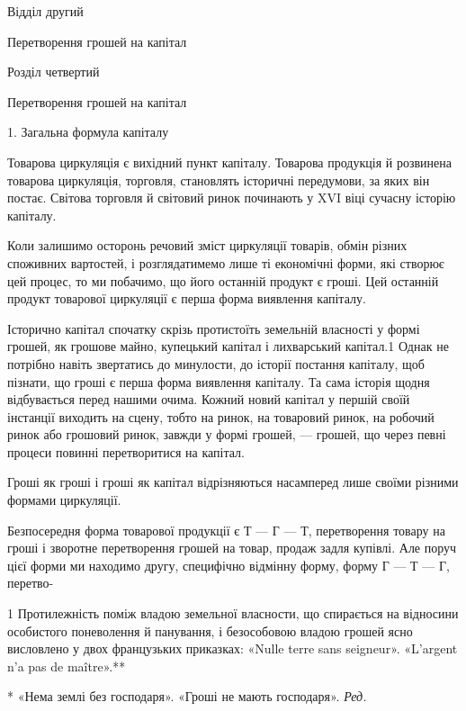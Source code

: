 Відділ другий

Перетворення грошей на капітал

Розділ четвертий

Перетворення грошей на капітал

1. Загальна формула капіталу

Товарова циркуляція є вихідний пункт капіталу. Товарова
продукція й розвинена товарова циркуляція, торговля, становлять
історичні передумови, за яких він постає. Світова торговля
й світовий ринок починають у XVI віці сучасну історію
капіталу.

Коли залишимо осторонь речовий зміст циркуляції товарів,
обмін різних споживних вартостей, і розглядатимемо лише ті
економічні форми, які створює цей процес, то ми побачимо,
що його останній продукт є гроші. Цей останній продукт товарової
циркуляції є перша форма виявлення капіталу.

Історично капітал спочатку скрізь протистоїть земельній
власності у формі грошей, як грошове майно, купецький капітал
і лихварський капітал.1 Однак не потрібно навіть звертатись до
минулости, до історії постання капіталу, щоб пізнати, що гроші
є перша форма виявлення капіталу. Та сама історія щодня відбувається
перед нашими очима. Кожний новий капітал у першій
своїй інстанції виходить на сцену, тобто на ринок, на товаровий
ринок, на робочий ринок або грошовий ринок, завжди у формі
грошей, — грошей, що через певні процеси повинні перетворитися
на капітал.

Гроші як гроші і гроші як капітал відрізняються насамперед
лише своїми різними формами циркуляції.

Безпосередня форма товарової продукції є Т — Г — Т, перетворення
товару на гроші і зворотне перетворення грошей на
товар, продаж задля купівлі. Але поруч цієї форми ми находимо
другу, специфічно відмінну форму, форму Г — Т — Г, перетво-

1    Протилежність поміж владою земельної власности, що спирається
на відносини особистого поневолення й панування, і безособовою владою
грошей ясно висловлено у двох французьких приказках: «Nulle terre
sans seigneur». «L’argent n’a pas de maître».**

* «Нема землі без господаря». «Гроші не мають господаря». \emph{Ред.}
